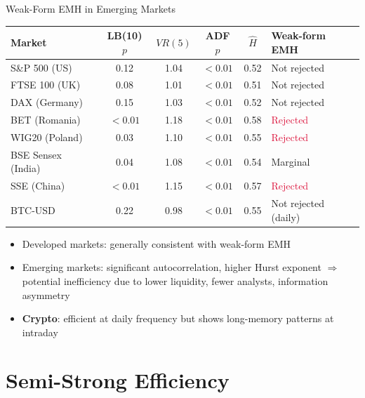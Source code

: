 \documentclass[9pt, aspectratio=169, t]{beamer}
\theoremstyle{definition}
\newenvironment{cminipage}[1]{%
    \par\noindent\hfill\begin{minipage}{#1}\ignorespaces
}{%
    \end{minipage}\hfill\null\par
}
\begin{document}
\begin{frame}{Weak-Form EMH in Emerging Markets}
\begin{cminipage}{0.95\textwidth}
\small
\renewcommand{\arraystretch}{1.2}
\begin{center}
\scriptsize
\renewcommand{\arraystretch}{1.3}
\begin{tabular}{lccccl}
\toprule
\textbf{Market} & \textbf{LB(10) $p$} & \textbf{$VR(5)$} & \textbf{ADF $p$} & \textbf{$\hat{H}$} & \textbf{Weak-form EMH} \\
\midrule
S\&P 500 (US) & 0.12 & 1.04 & $<0.01$ & 0.52 & Not rejected \\
FTSE 100 (UK) & 0.08 & 1.01 & $<0.01$ & 0.51 & Not rejected \\
DAX (Germany) & 0.15 & 1.03 & $<0.01$ & 0.52 & Not rejected \\
BET (Romania) & $<0.01$ & 1.18 & $<0.01$ & 0.58 & \textcolor{Crimson}{Rejected} \\
WIG20 (Poland) & 0.03 & 1.10 & $<0.01$ & 0.55 & \textcolor{Crimson}{Rejected} \\
BSE Sensex (India) & 0.04 & 1.08 & $<0.01$ & 0.54 & \textcolor{Amber}{Marginal} \\
SSE (China) & $<0.01$ & 1.15 & $<0.01$ & 0.57 & \textcolor{Crimson}{Rejected} \\
BTC-USD & 0.22 & 0.98 & $<0.01$ & 0.55 & Not rejected (daily) \\
\bottomrule
\end{tabular}
\end{center}

\vspace{0.2cm}
\begin{itemize}\setlength{\itemsep}{0pt}
    \item Developed markets: generally consistent with weak-form EMH
    \item Emerging markets: significant autocorrelation, higher Hurst exponent $\Rightarrow$ potential inefficiency due to lower liquidity, fewer analysts, information asymmetry
    \item \textbf{Crypto}: efficient at daily frequency but shows long-memory patterns at intraday
\end{itemize}
\end{cminipage}
\end{frame}

\section{Semi-Strong Efficiency}
\end{document}

